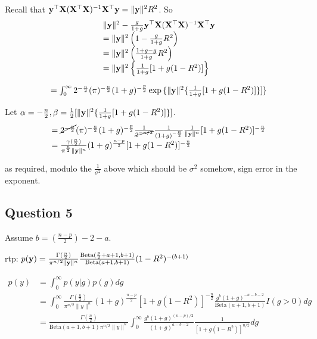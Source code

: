 \documentclass{amsart}[12pt]
\begin{document}
Recall that ${\bf y}^\top {\bf X}({\bf X}^\top {\bf X})^{-1} {\bf X}^\top {\bf y} = \| {\bf y} \|^2 R^2$. So
\begin{equation*}
\begin{array}{ll}
& \| {\bf y} \|^2 -\frac{g}{1 + g} {\bf y}^\top {\bf X} ({\bf X}^\top {\bf X})^{-1} {\bf X}^\top {\bf y} \\
&= \| {\bf y} \|^2 \left(1 - \frac{g}{1 + g}R^2 \right) \\
&= \| {\bf y} \|^2 \left(\frac{1 + g - g}{1 + g} R^2 \right) \\
&= \| {\bf y} \|^2 \left\{ \frac{1}{1 + g} [ 1 + g(1 - R^2) ] \right\}
\end{array}
\end{equation*}

\begin{equation*}
\begin{array}{ll}
&= \int_0^\infty 2^{-\frac{n}{2}} (\pi)^{-\frac{n}{2}} (1 + g)^{-\frac{p}{2}} \exp{\{ \| {\bf y}\|^2 \{ \frac{1}{1 + g} [1 + g(1 - R^2)] \}} ] \}
\end{array}
\end{equation*}

Let $\alpha = -\frac{n}{2}, \beta = \tfrac{1}{2} [\| {\bf y} \|^2 \{ \frac{1}{1 + g} [1 + g(1 - R^2)] \}]$.
\begin{equation*}
\begin{array}{ll}
&= \cancel{2^{- \frac{n}{2}}} (\pi)^{-\frac{n}{2}} (1 + g)^{-\frac{p}{2}} \frac{1}{\cancel{2^{-n/2}}} \frac{1}{(1 + g)^{-\frac{n}{2}}} \frac{1}{\| {\bf y} \|^n} [1 + g(1 - R^2)]^{-\frac{n}{2}} \\
&= \frac{\gamma(\frac{n}{2})}{\pi^{\frac{n}{2}} \| {\bf y} \|^n} (1 + g)^{\frac{n - p}{2}} [1 + g(1 - R^2)]^{-\frac{n}{2}}
\end{array}
\end{equation*}

as required, modulo the $\frac{1}{\sigma^2}$ above which should be $\sigma^2$ somehow, sign error in the
exponent.

\subsection{Question 5}

Assume $b = (\frac{n - p}{2}) - 2 - a$.

rtp: $p({\bf y}) = \frac{\Gamma(\frac{n}{2})}{\pi^{n/2} \| {\bf y} \|^n} \frac{\text{Beta}(\frac{p}{2} + a + 1, b + 1)}{\text{Beta}(a + 1, b + 1)} (1 - R^2)^{-(b + 1)}$

\begin{equation*}
\begin{array}{ll}
p(y) &= \int_0^\infty p(y|g) p(g) dg \\
&= \int_0^\infty \frac{\Gamma(\frac{n}{2})}{\pi^{n/2} \| y \|^n} (1 + g)^{\frac{n - p}{2}}[1 + g(1 - R^2)]^{-\frac{n}{2}} \frac{g^b (1 + g)^{-a - b - 2}}{\text{Beta}(a + 1, b + 1)} I(g > 0) dg \\
&= \frac{\Gamma(\frac{n}{2})}{\text{Beta}(a + 1, b + 1) \pi^{n/2} \| y \|^n}
\int_0^\infty \frac{g^b (1 + g)^{(n - p)/2}}{(1 + g)^{a - b - 2}} \frac{1}{[1 + g(1 - R^2)]^{n/2}} dg
\end{array}
\end{equation*}
\end{document}
